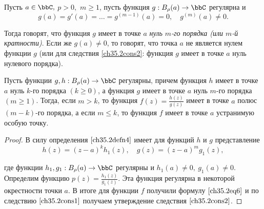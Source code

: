 \begin{defn} \label{ch35.2defn4}
Пусть $a \in \bbC,$ $p > 0,$ $m \ge 1$, пусть функция $g : B_{\rho}(a) \to \bbC$ регулярна и
$$
g(a) = g'(a) = \ldots = g^{(m - 1)}(a) = 0, \quad g^{(m)}(a) \not= 0.
$$

Тогда говорят, что функция $g$ имеет в точке $a$ \textit{нуль $m$-го порядка (или $m$-й кратности)}. Если же $g(a) \not= 0$, то говорят, что точка $a$ не является нулем функции $g$ (или для следствия \ref{ch35.2cons2}: функция $g$ имеет в точке $a$ нуль нулевого порядка).
\end{defn}

\begin{cons} \label{ch35.2cons2}
Пусть функции $g,h : B_\rho(a) \to \bbC$ регулярны, причем функция $h$ имеет в точке $a$ нуль $k$-го порядка $(k \ge 0)$, а функция $g$ имеет в точке $a$ нуль $m$-го порядка $(m \ge 1)$. Тогда, если
$m > k$, то функция $f(z) = \frac{h(z)}{g(z)}$ имеет в точке $a$ полюс $(m - k)$-го порядка, а если $m \le k$, то функция $f$ имеет в точке $a$ устранимую особую точку.
\end{cons}

\begin{proof}
В силу определения $\eqref{ch35.2defn4}$ имеет для функций $h$ и $g$ представление
$$
h(z) = (z - a)^k h_1(z), \quad g(z) = (z - a)^m g_1(z),
$$

где функции $h_1,g_1 : B_\rho(a) \to \bbC$ регулярны и $h_1(a) \not= 0, \: g_1(a) \not= 0$.
Определим функцию $p(z) = \frac{h_1(z)}{g_1(z)}$. Эта функция регулярна в некоторой окрестности точки $a$. В итоге для функции $f$ получили формулу $\eqref{ch35.2eq6}$ и по следствию $\eqref{ch35.2cons1}$ получаем утверждение следствия $\eqref{ch35.2cons2}$.

\end{proof}

